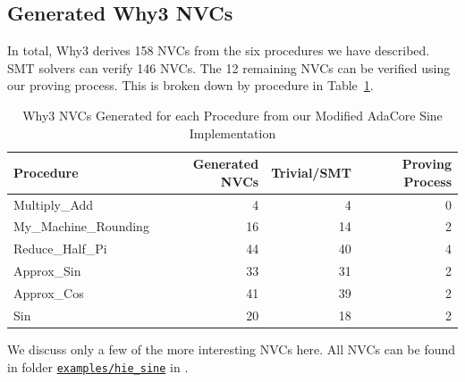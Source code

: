 \documentclass[runningheads]{llncs}
\begin{document}
\subsection{Generated Why3 NVCs}
In total, Why3 derives 158 NVCs from the six procedures we have described.
SMT solvers can verify 146 NVCs.
The 12 remaining NVCs can be verified using our proving process.
This is broken down by procedure in Table~\ref{table:hieVCs}. 

\begin{table}[t]
  \caption{Why3 NVCs Generated for each Procedure from our Modified AdaCore Sine Implementation}
  \label{table:hieVCs}
  \centering
  \begin{tabular}{l@{\kern1em}r@{\kern1em}r@{\kern1em}r}
  \toprule
  Procedure             & Generated NVCs & Trivial/SMT & Proving 
  Process \\
  \midrule
  Multiply\_Add         & 4                       & 4                             & 0                                           \\
  My\_Machine\_Rounding & 16                       & 14                           & 2                                           \\
  Reduce\_Half\_Pi      & 44                      & 40                            & 4                                           \\
  Approx\_Sin           & 33                      & 31                            & 2                                           \\
  Approx\_Cos           & 41                      & 39                            & 2                                           \\
  Sin                   & 20                      & 18                             & 2                                           \\
  \bottomrule
  \end{tabular}
\end{table}

We discuss only a few of the more interesting NVCs here.
All NVCs can be found in folder \href{https://github.com/rasheedja/PropaFP/tree/master/examples/hie_sine/txt}{\texttt{examples/hie\_sine}} in \cite{noauthor_rasheedjapropafp_nodate}.
\end{document}
